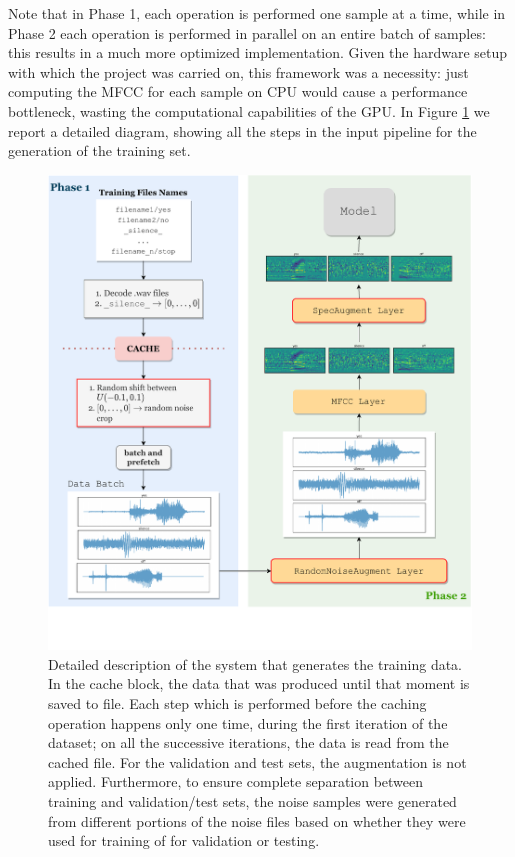 Note that in Phase 1, each operation is performed one sample at a time, while in Phase 2 each operation is performed in parallel on an entire batch of samples: this results in a much more optimized implementation. Given the hardware setup with which the project was carried on, this framework was a necessity: just computing the MFCC for each sample on CPU would cause a performance bottleneck, wasting the computational capabilities of the GPU. In Figure \ref{fig:inputpipeline} we report a detailed diagram, showing all the steps in the input pipeline for the generation of the training set.

\begin{figure}[h]
	\centering
	\includegraphics[width=0.99\linewidth]{imgs/input_pipeline_v3.pdf}
	\caption{Detailed description of the system that generates the training data. In the cache block, the data that was produced until that moment is saved to file. Each step which is performed before the caching operation happens only one time, during the first iteration of the dataset; on all the successive iterations, the data is read from the cached file. For the validation and test sets, the augmentation is not applied. Furthermore, to ensure complete separation between training and validation/test sets, the noise samples were generated from different portions of the noise files based on whether they were used for training of for validation or testing.}
	\label{fig:inputpipeline}
\end{figure}





